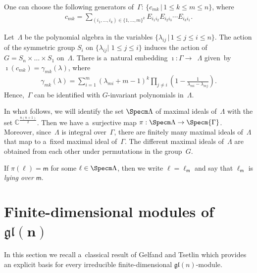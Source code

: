 \documentclass[pdftex]{sigma}
\numberwithin{equation}{section}
\begin{document}
One can choose the following generators of~$\Gamma$: $\{c_{mk} \,|\, 1\leq k\leq m\leq n \}$, where
\begin{gather}
\label{equ_3}
c_{mk}= {\sum\limits_{(i_1,\ldots,i_k)\in \{1,\ldots,m \}^k}} E_{i_1 i_2}E_{i_2 i_3}\cdots E_{i_k i_1}.
\end{gather}

Let~$\Lambda$ be the polynomial algebra in the variables $\{\lambda_{ij}\, | \, 1\leqslant j\leqslant i\leqslant n \}$.
The action of the symmetric group $S_i$ on $\{\lambda_{ij} |$ $1\leqslant j\leqslant i\}$ induces the action of $G = S_n
\times\dots \times S_1$ on~$\Lambda$.
There is a~natural embedding $\imath:{{\Gamma}}{\longrightarrow}$~$\Lambda$ given~by
$\imath(c_{mk})=\gamma_{mk}(\lambda)$, where
\begin{gather}
\label{def-gamma}
\gamma_{mk}(\lambda)=\sum\limits_{i=1}^m (\lambda_{mi}+m-1)^k \prod\limits_{j\ne i} \left(1-\frac{1}{\lambda_{mi}-\lambda_{mj}} \right).
\end{gather}
Hence,~$\Gamma$ can be identif\/ied with $G$-invariant polynomials in~$\Lambda$.

\begin{Remark}
\label{maximal ideals differ by permutations}
In what follows, we will identify the set $\Specm \Lambda$ of maximal ideals of~$\Lambda$ with the set
$\mathbb{C}^{\frac{n(n+1)}{2}}$.
Then we have a~surjective map $\pi: \Specm\Lambda \rightarrow \Specm{\Gamma}$.
Moreover, since~$\Lambda$ is integral over~$\Gamma$, there are f\/initely many maximal ideals of~$\Lambda$ that map to
a~f\/ixed maximal ideal of~$\Gamma$.
The dif\/ferent maximal ideals of~$\Lambda$ are obtained from each other under permutations in the group~$G$.
\end{Remark}
If $\pi(\ell)=\mathsf m$ for some $\ell\in \Specm \Lambda$, then we write $\ell=\ell_{\mathsf m}$ and say that
$\ell_{\mathsf m}$ is {\it lying over} $\mathsf m$.

\section[Finite-dimensional modules of $\mathfrak{gl}(n)$]{Finite-dimensional modules of $\boldsymbol{\mathfrak{gl}(n)}$}
\label{section4}

In this section we recall a~classical result of Gelfand and Tsetlin which provides an explicit basis for every
irreducible f\/inite-dimensional $\mathfrak{gl}(n)$-module.
\end{document}
